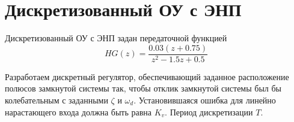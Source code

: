\chapter{Дискретизованный ОУ с ЭНП}
\label{ch:chap4}
Дискретизованный ОУ с ЭНП задан передаточной функцией
\begin{equation}
	HG(z) = \frac{0.03(z+0.75)}{z^2 - 1.5 z + 0.5}
\end{equation}

Разработаем дискретный регулятор, обеспечивающий заданное расположение полюсов замкнутой системы так, чтобы отклик замкнутой системы был бы колебательным с заданными $\zeta$ и $\omega_d$. Установившаяся ошибка для линейно нарастающего входа должна быть равна $K_v$. Период дискретизации $T$.

\endinput